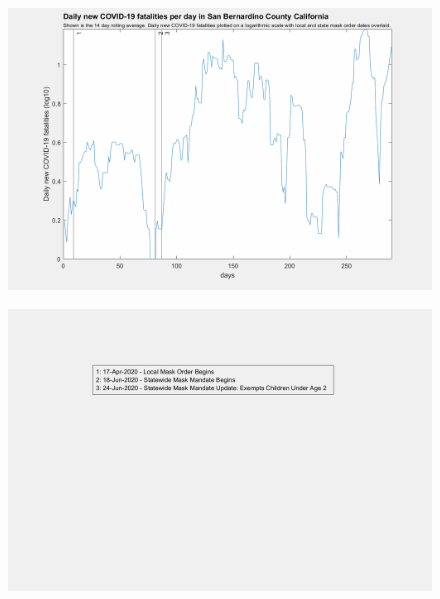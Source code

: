 \documentclass[]{article}
\begin{document}
\begin{figure}[!h]
	\includegraphics[width=\linewidth]{images/san_bernardino_mask_order_fatalities_log.png}
	\caption{}
	\label{fig:images/san_bernardino_mask_order_fatalities_logLabel}
\end{figure}

\begin{figure}[!h]
	\includegraphics[width=\linewidth]{legends/san_francisco_mask_order_legend.png}
	\caption{}
	\label{fig:legends/san_francisco_mask_order_legendLabel}
\end{figure}
\end{document}
